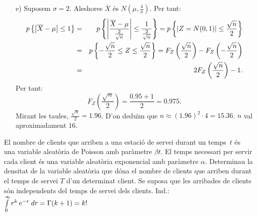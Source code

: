 {\begin{itemize}
	Fent servir l'apartat c), tenim que 
	\mbox{$\overline{X}=\frac{S}{n}$} \'es 
	$N\left(\mu,\frac{\sigma^2}{n}\right)$. Basta prendre $a=\frac{1}{n}$ i $b=0$.
	
	\item[e)] Suposem $\sigma =2$. Aleshores 
	$\overline{X}$ \'es $N\left(\mu,\frac{4}{n}\right)$. Per tant:
	\begin{eqnarray*}
		p\left\{\left|\overline{X}-\mu\right|\leq 1\right\} & = & 
		p\left\{\left|\frac{\overline{X}-\mu}{\frac{2}{\sqrt{n}}}
		\right|\leq 
		\frac{1}{\frac{2}{\sqrt{n}}}\right\}=p\left\{|Z=N(0,1)|\leq 
		\frac{\sqrt{n}}{2}\right\} \\  
		 & = & p\left\{-\frac{\sqrt{n}}{2}\leq Z\leq 
		 \frac{\sqrt{n}}{2}\right\}= F_Z 
		 \left(\frac{\sqrt{n}}{2}\right)-F_Z\left( -\frac{\sqrt{n}}{2}\right) \\
		 & = & 2 F_Z\left(\frac{\sqrt{n}}{2}\right)-1.
	\end{eqnarray*}
	Per tant:
	$$
	F_Z\left(\frac{\sqrt{n}}{2}\right)=\frac{0.95 +1}{2}=0.975.
	$$
	Mirant les taules, $\frac{\sqrt{n}}{2}=1.96$. D'on dedu\"{\i}m que
\mbox{$n\approx 
	{(1.96)}^2\cdot 4 =15.36$.} $n$ val aproximadament $16$.
\end{itemize}}

\begin{probres}
{El nombre de clients que arriben a una estaci\'o de servei durant un 
temps~$t$ \'es una variable aleat\`oria de Poisson amb par\`ametre 
$\beta t$. El temps necessari per servir cada client \'es una variable 
aleat\`oria exponencial amb par\`ametre $\alpha$. Determinau la densitat 
de la variable aleat\`oria que d\'ona el nombre de clients que arriben 
durant el temps de servei $T$ d'un determinat client. Se suposa que les 
arribades de clients s\'on independents del temps de servei dels clients.
Ind.: $\int\limits_0^\infty r^k\>  {\rm e}^{-r} \> dr = \Gamma(k+1) = k!$
}
\end{probres}

